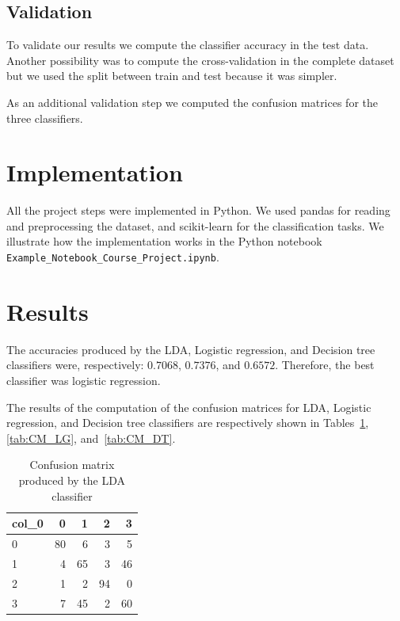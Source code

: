 \documentclass{article} %
\begin{document}
\subsection{Validation}
 
 To validate our results we compute the classifier accuracy in the test data. Another possibility was to compute the cross-validation in the complete dataset but we used the split between train and test because it was simpler. 

 As an additional validation step we computed the confusion matrices for the three classifiers.
 
\section{Implementation}

 All the project steps were implemented in Python. We used pandas for reading and preprocessing the dataset, and scikit-learn for the classification tasks. We illustrate how the implementation works in the Python notebook \texttt{Example\_Notebook\_Course\_Project.ipynb}.


\section{Results}

 The accuracies produced by the LDA, Logistic regression, and Decision tree classifiers were, respectively: $0.7068$, $0.7376$, and $0.6572$. Therefore, the best classifier was logistic regression.

 The results of the computation of the confusion matrices for  LDA, Logistic regression, and Decision tree classifiers are respectively shown in Tables~\ref{tab:CM_LDA}, \ref{tab:CM_LG}, and~\ref{tab:CM_DT}.

\begin{table}
\centering
\begin{tabular}{lrrrr}
\toprule \hline
col\_0 &   0 &   1 &   2 &   3 \\\hline
0     &  80 &   6 &   3 &   5 \\\hline
1     &   4 &  65 &   3 &  46 \\\hline
2     &   1 &   2 &  94 &   0 \\\hline
3     &   7 &  45 &   2 &  60 \\\hline
\bottomrule \hline
\end{tabular}
\caption{Confusion matrix produced by the LDA classifier}
 \label{tab:CM_LDA}
\end{table}
\end{document}
